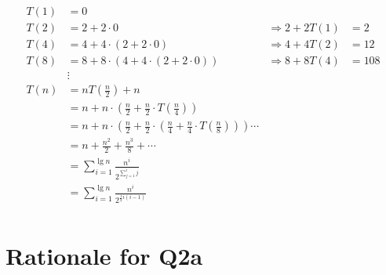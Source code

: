 \documentclass[12pt]{article}
\begin{document}
\begin{enumerate}
\begin{enumerate}
        \begin{align*}
            T(1) &= 0 \\
            T(2) &= 2 + 2 \cdot 0 &\Rightarrow 2 + 2T(1) &= 2 \\
            T(4) &= 4 + 4 \cdot (2 + 2 \cdot 0) &\Rightarrow 4 + 4T(2) &= 12 \\
            T(8) &= 8 + 8 \cdot (4 + 4 \cdot (2 + 2 \cdot 0)) &\Rightarrow 8 + 8T(4) &= 108 \\
            &\vdots \\
            T(n) &= nT(\tfrac{n}{2}) + n \\
            &= n + n \cdot (\tfrac{n}{2} + \tfrac{n}{2} \cdot T(\tfrac{n}{4})) \\
            &= n + n \cdot (\tfrac{n}{2} + \tfrac{n}{2} \cdot (\tfrac{n}{4} + \tfrac{n}{4} \cdot T(\tfrac{n}{8}))) \cdots \\
            &= n + \tfrac{n^{2}}{2} + \tfrac{n^{3}}{8} + \cdots \\
            &= \sum_{i = 1}^{\lg n} \frac{n^{i}}{2^{\sum_{j = 1}^{i} j}}\\
            &= \sum_{i = 1}^{\lg n} \frac{n^{i}}{2^{\frac{1}{2}i (i - 1)}} \\
        \end{align*}
    \end{enumerate}
\end{enumerate}

\appendix

\section{Rationale for Q2a}
\end{document}
